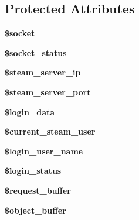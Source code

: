 \subsection*{Protected Attributes}
\begin{DoxyCompactItemize}
\item 
\hypertarget{classsteam__connection_ac03e84bd9e67cef9202b7f451425561b}{
{\bfseries \$socket}}
\label{classsteam__connection_ac03e84bd9e67cef9202b7f451425561b}

\item 
\hypertarget{classsteam__connection_add41a446d2ab31d98233f454e0d4b9cd}{
{\bfseries \$socket\_\-status}}
\label{classsteam__connection_add41a446d2ab31d98233f454e0d4b9cd}

\item 
\hypertarget{classsteam__connection_a7150f7083a4f6b48b81aa9489eea4090}{
{\bfseries \$steam\_\-server\_\-ip}}
\label{classsteam__connection_a7150f7083a4f6b48b81aa9489eea4090}

\item 
\hypertarget{classsteam__connection_a10a5a13e98d9f2ce37be1f31e56c334a}{
{\bfseries \$steam\_\-server\_\-port}}
\label{classsteam__connection_a10a5a13e98d9f2ce37be1f31e56c334a}

\item 
\hypertarget{classsteam__connection_aeef49bd6714ce8b4ed3b2b498879fa40}{
{\bfseries \$login\_\-data}}
\label{classsteam__connection_aeef49bd6714ce8b4ed3b2b498879fa40}

\item 
\hypertarget{classsteam__connection_ad2c4518f15daa8724745dcfe30d1ecf6}{
{\bfseries \$current\_\-steam\_\-user}}
\label{classsteam__connection_ad2c4518f15daa8724745dcfe30d1ecf6}

\item 
\hypertarget{classsteam__connection_a93d3d7fc0338abc47e8fc2ec484e517e}{
{\bfseries \$login\_\-user\_\-name}}
\label{classsteam__connection_a93d3d7fc0338abc47e8fc2ec484e517e}

\item 
\hypertarget{classsteam__connection_aa6eb424270bd71cb5c729c29cb101969}{
{\bfseries \$login\_\-status}}
\label{classsteam__connection_aa6eb424270bd71cb5c729c29cb101969}

\item 
\hypertarget{classsteam__connection_af07bf75514b66e943bd89c3e13773a95}{
{\bfseries \$request\_\-buffer}}
\label{classsteam__connection_af07bf75514b66e943bd89c3e13773a95}

\item 
\hypertarget{classsteam__connection_a624aa3289b4ee7857f48e4545f27af6c}{
{\bfseries \$object\_\-buffer}}
\label{classsteam__connection_a624aa3289b4ee7857f48e4545f27af6c}


\end{DoxyCompactItemize}
